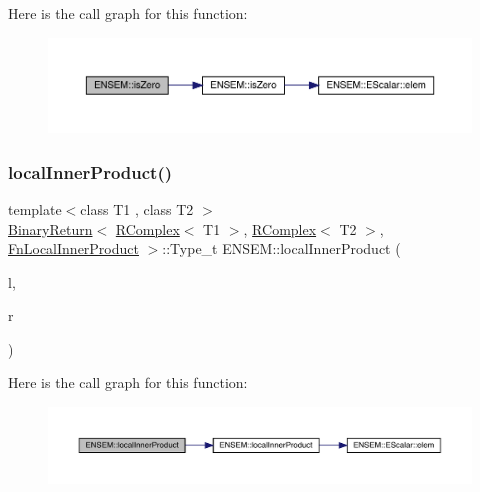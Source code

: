 Here is the call graph for this function\+:\nopagebreak
\begin{figure}[H]
\begin{center}
\leavevmode
\includegraphics[width=350pt]{da/dc7/group__rcomplex_ga21235851ad3c6bba4973c55332baaa9e_cgraph}
\end{center}
\end{figure}
\mbox{\label{group__rcomplex_ga4ccc8c0a3c54b7eb19e0d5aa1c6ac89d}} 
\subsubsection{\texorpdfstring{localInnerProduct()}{localInnerProduct()}}
{\footnotesize\ttfamily template$<$class T1 , class T2 $>$ \\
\mbox{\hyperlink{structENSEM_1_1BinaryReturn}{Binary\+Return}}$<$ \mbox{\hyperlink{classENSEM_1_1RComplex}{R\+Complex}}$<$ T1 $>$, \mbox{\hyperlink{classENSEM_1_1RComplex}{R\+Complex}}$<$ T2 $>$, \mbox{\hyperlink{structENSEM_1_1FnLocalInnerProduct}{Fn\+Local\+Inner\+Product}} $>$\+::Type\+\_\+t E\+N\+S\+E\+M\+::local\+Inner\+Product (\begin{DoxyParamCaption}\item[{const \mbox{\hyperlink{classENSEM_1_1RComplex}{R\+Complex}}$<$ T1 $>$ \&}]{l,  }\item[{const \mbox{\hyperlink{classENSEM_1_1RComplex}{R\+Complex}}$<$ T2 $>$ \&}]{r }\end{DoxyParamCaption})\hspace{0.3cm}{\ttfamily [inline]}}

Here is the call graph for this function\+:\nopagebreak
\begin{figure}[H]
\begin{center}
\leavevmode
\includegraphics[width=350pt]{da/dc7/group__rcomplex_ga4ccc8c0a3c54b7eb19e0d5aa1c6ac89d_cgraph}
\end{center}
\end{figure}
\mbox{\label{group__rcomplex_ga1480abb301211dfb7c0071739fce6a6a}} 
